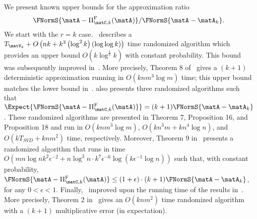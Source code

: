 We present known upper bounds for the approximation ratio
$$\FNormS{\matA-\Pi_{\matC,k}^{\mathrm{F}}(\matA)} / \FNormS{\matA-\matA_k}.$$
We start with the $r = k$ case.~\cite{BMD09a} describes a $T_{\matV_k} + O\left(  nk + k^3 \left(\log^2 k\right) \left(\log \log k\right) \right)$
time randomized algorithm which provides an upper bound $O\left( k \log^{\frac{1}{2} } k \right)$ with constant probability.
This bound was subsequently improved in~\cite{DR10}. More precisely,
Theorem 8 of~\cite{DR10} gives a $(k+1)$ deterministic approximation
running in $O(knm^3 \log m)$ time;
this upper bound matches the lower
bound in~\cite{DRVW06}.
\cite{DR10} also presents three randomized algorithms such that $ \Expect{ \FNormS{\matA-\Pi_{\matC,k}^\mathrm{F}(\matA)} } = (k+1)\FNormS{\matA-\matA_k}$.
These randomized algorithms are presented in Theorem 7, Proposition 16, and Proposition 18 and run in
$O\left( knm^3 \log m \right)$, $O\left( kn^3m + k n ^4 \log n \right)$, and $O\left( k T_{SVD} +   knm^2 \right)$ time, respectively.
Moreover, Theorem 9 in~\cite{DR10} presents a randomized algorithm that runs in time 
$O\left( m n \log n k^2 \epsilon^{-2} + n \log^3 n \cdot k^7 \epsilon^{-6} \log\left(k \epsilon^{-1} \log n\right) \right)$
such that, with constant probability, 
$ \FNormS{\matA-\Pi_{\matC,k}^\mathrm{F}(\matA)} \le (1+\epsilon) \cdot (k+1)\FNormS{\matA-\matA_k}$,
for any $0 < \epsilon < 1$. Finally,~\cite{GS2011} improved upon the running time of the results in~\cite{DR10}.
More precisely, Theorem 2 in~\cite{GS2011} gives an $O\left( knm^2 \right)$ time randomized algorithm with
a $(k+1)$ multiplicative error (in expectation).

